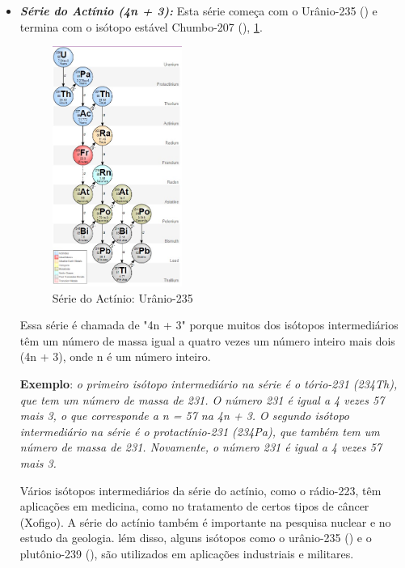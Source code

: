 \documentclass[11pt,a4paper]{article}
\begin{document}
\begin{itemize}
        \item \textbf{\textit{\textcolor{CarnationPink}{Série do Actínio (4n + 3):}}} Esta série começa com o Urânio-235 () e termina com o isótopo estável Chumbo-207 (), \ref{fig:serieDoActinio}. 
                    
                    
                        \begin{figure}[h]
                            \centering
                            \includegraphics[width=0.4\textwidth]{Imagens/serieDoActinio.jpg}
                            \caption{Série do Actínio: Urânio-235}
                            \label{fig:serieDoActinio}
                        \end{figure}
                    
        Essa série é chamada de "4n + 3" porque muitos dos isótopos intermediários têm um número de massa igual a quatro vezes um número inteiro mais dois (4n + 3), onde n é um número inteiro.

        \textbf{Exemplo}: \textit{o primeiro isótopo intermediário na série é o tório-231 (234Th), que tem um número de massa de 231. O número 231 é igual a 4 vezes 57 mais 3, o que corresponde a n = 57 na  4n + 3. O segundo isótopo intermediário na série é o protactínio-231 (234Pa), que também tem um número de massa de 231. Novamente, o número 231 é igual a 4 vezes 57 mais 3.}

        Vários isótopos intermediários da série do actínio, como o rádio-223, têm aplicações em medicina, como no tratamento de certos tipos de câncer (Xofigo). A série do actínio também é importante na pesquisa nuclear e no estudo da geologia. lém disso, alguns isótopos como o urânio-235 () e o plutônio-239 (), são utilizados em aplicações industriais e militares.

    \end{itemize}
                
\end{document}
